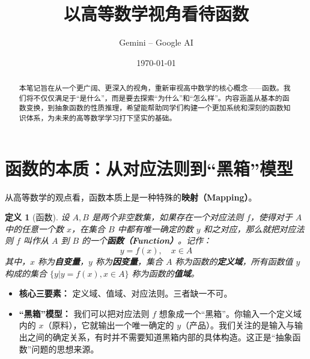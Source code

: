 \documentclass[a4paper,12pt]{ctexart}
\theoremstyle{mytheoremstyle}
\newtheorem{definition}{定义}[section]
\begin{document}
\renewcommand{\notetitle}{以高等数学视角看待函数}
\renewcommand{\noteauthor}{Gemini -- Google AI}
\renewcommand{\notedate}{\today}

\title{\Huge\bfseries\color{myblue} \notetitle}
\author{\noteauthor}
\date{\notedate}
\maketitle

\begin{abstract}
    \noindent
    本笔记旨在从一个更广阔、更深入的视角，重新审视高中数学的核心概念——函数。我们将不仅仅满足于“是什么”，而是要去探索“为什么”和“怎么样”。内容涵盖从基本的函数变换，到抽象函数的性质推理，希望能帮助同学们构建一个更加系统和深刻的函数知识体系，为未来的高等数学学习打下坚实的基础。
\end{abstract}

\tableofcontents
\newpage

\section{函数的本质：从对应法则到“黑箱”模型}

从高等数学的观点看，函数本质上是一种特殊的\textbf{映射（Mapping）}。

\begin{definition}[函数]
    设 $A, B$ 是两个非空数集，如果存在一个对应法则 $f$，使得对于 $A$ 中的任意一个数 $x$，在集合 $B$ 中都有唯一确定的数 $y$ 和之对应，那么就把对应法则 $f$ 叫作从 $A$ 到 $B$ 的一个\textbf{函数（Function）}。记作：
    \[ y = f(x), \quad x \in A \]
    其中，$x$ 称为\textbf{自变量}，$y$ 称为\textbf{因变量}，集合 $A$ 称为函数的\textbf{定义域}，所有函数值 $y$ 构成的集合 $\{ y | y=f(x), x \in A \}$ 称为函数的\textbf{值域}。
\end{definition}

\begin{itemize}
    \item \textbf{核心三要素：} 定义域、值域、对应法则。三者缺一不可。
    \item \textbf{“黑箱”模型：} 我们可以把对应法则 $f$ 想象成一个“黑箱”。你输入一个定义域内的 $x$（原料），它就输出一个唯一确定的 $y$（产品）。我们关注的是输入与输出之间的确定关系，有时并不需要知道黑箱内部的具体构造。这正是“抽象函数”问题的思想来源。
\end{itemize}
\end{document}
